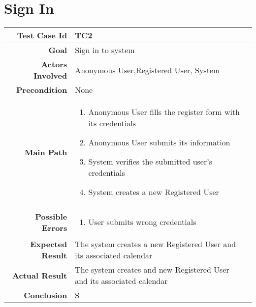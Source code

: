 \section{Sign In}
\begin{tabularx}{\linewidth}{|r|X|X|}

  \hline   {\bf Test Case Id} &  TC2\\
  \hline  {\bf Goal} & Sign in to system\\
  \hline  {\bf Actors Involved} & Anonymous User,Registered User, System\\
  \hline  {\bf Precondition} & None\\ 
   \hline  {\bf Main Path} & \begin{enumerate} 
   \item Anonymous User fills the register form with its credentials
   \item Anonymous User submits its information
   \item System verifies the submitted user's credentials
    \item System creates a new Registered User
   \end{enumerate}\\
   \hline  {\bf Possible Errors} & \begin{enumerate} 
   \item User submits wrong credentials 
   \end{enumerate}\\
  \hline  {\bf Expected Result} & The system creates a new Registered User and its associated calendar\\
  \hline  {\bf Actual Result} & The system creates and new Registered User and its associated calendar\\
  \hline  {\bf Conclusion} & S\\
  \hline
  
\end{tabularx}

